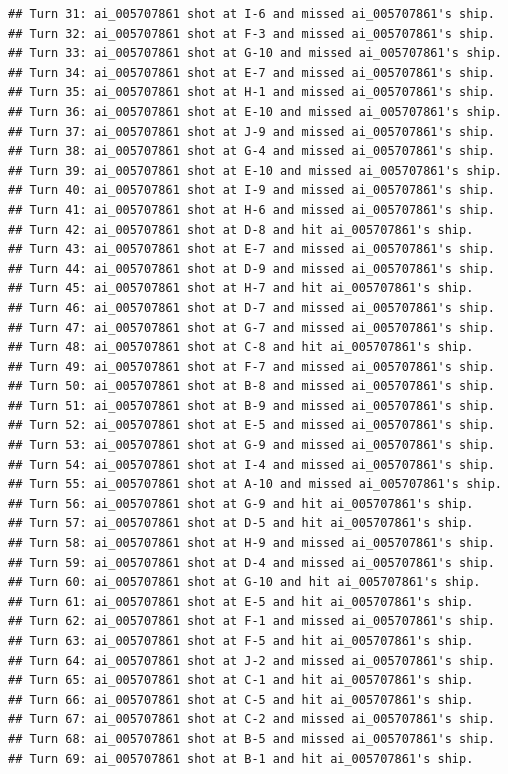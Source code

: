 \documentclass[
]{article}
\begin{document}
\begin{verbatim}
## Turn 31: ai_005707861 shot at I-6 and missed ai_005707861's ship.
## Turn 32: ai_005707861 shot at F-3 and missed ai_005707861's ship.
## Turn 33: ai_005707861 shot at G-10 and missed ai_005707861's ship.
## Turn 34: ai_005707861 shot at E-7 and missed ai_005707861's ship.
## Turn 35: ai_005707861 shot at H-1 and missed ai_005707861's ship.
## Turn 36: ai_005707861 shot at E-10 and missed ai_005707861's ship.
## Turn 37: ai_005707861 shot at J-9 and missed ai_005707861's ship.
## Turn 38: ai_005707861 shot at G-4 and missed ai_005707861's ship.
## Turn 39: ai_005707861 shot at E-10 and missed ai_005707861's ship.
## Turn 40: ai_005707861 shot at I-9 and missed ai_005707861's ship.
## Turn 41: ai_005707861 shot at H-6 and missed ai_005707861's ship.
## Turn 42: ai_005707861 shot at D-8 and hit ai_005707861's ship.
## Turn 43: ai_005707861 shot at E-7 and missed ai_005707861's ship.
## Turn 44: ai_005707861 shot at D-9 and missed ai_005707861's ship.
## Turn 45: ai_005707861 shot at H-7 and hit ai_005707861's ship.
## Turn 46: ai_005707861 shot at D-7 and missed ai_005707861's ship.
## Turn 47: ai_005707861 shot at G-7 and missed ai_005707861's ship.
## Turn 48: ai_005707861 shot at C-8 and hit ai_005707861's ship.
## Turn 49: ai_005707861 shot at F-7 and missed ai_005707861's ship.
## Turn 50: ai_005707861 shot at B-8 and missed ai_005707861's ship.
## Turn 51: ai_005707861 shot at B-9 and missed ai_005707861's ship.
## Turn 52: ai_005707861 shot at E-5 and missed ai_005707861's ship.
## Turn 53: ai_005707861 shot at G-9 and missed ai_005707861's ship.
## Turn 54: ai_005707861 shot at I-4 and missed ai_005707861's ship.
## Turn 55: ai_005707861 shot at A-10 and missed ai_005707861's ship.
## Turn 56: ai_005707861 shot at G-9 and hit ai_005707861's ship.
## Turn 57: ai_005707861 shot at D-5 and hit ai_005707861's ship.
## Turn 58: ai_005707861 shot at H-9 and missed ai_005707861's ship.
## Turn 59: ai_005707861 shot at D-4 and missed ai_005707861's ship.
## Turn 60: ai_005707861 shot at G-10 and hit ai_005707861's ship.
## Turn 61: ai_005707861 shot at E-5 and hit ai_005707861's ship.
## Turn 62: ai_005707861 shot at F-1 and missed ai_005707861's ship.
## Turn 63: ai_005707861 shot at F-5 and hit ai_005707861's ship.
## Turn 64: ai_005707861 shot at J-2 and missed ai_005707861's ship.
## Turn 65: ai_005707861 shot at C-1 and hit ai_005707861's ship.
## Turn 66: ai_005707861 shot at C-5 and hit ai_005707861's ship.
## Turn 67: ai_005707861 shot at C-2 and missed ai_005707861's ship.
## Turn 68: ai_005707861 shot at B-5 and missed ai_005707861's ship.
## Turn 69: ai_005707861 shot at B-1 and hit ai_005707861's ship.

\end{verbatim}
\end{document}
